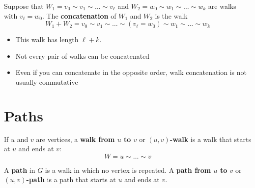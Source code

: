 \documentclass[ignorenonframetext,aspectratio=169]{beamer}
\let\defined\textbf
\begin{document}

\begin{frame}[label=concat-def]
\begin{definition}
Suppose that $W_1 = v_0 \sim v_1 \sim \dots \sim v_\ell$ and
$W_2 = w_0 \sim w_1 \sim \dots \sim w_k$
are walks with $v_\ell = w_0$.  The \defined{concatenation} of $W_1$ and $W_2$
is the walk
\[
   W_1 + W_2 = v_0 \sim v_1 \sim \dots \sim (v_\ell = w_0) \sim w_1 \sim \dots \sim w_k
\]
\end{definition}
\begin{itemize}
\item This walk has length $\ell+k$.
\item Not every pair of walks can be concatenated
\item Even if you can concatenate in the opposite order, walk concatenation is not usually commutative
\end{itemize}
\end{frame}

\section{Paths}

\begin{frame}[label=path-def]
\begin{definition}
    If $u$ and $v$ are vertices, a \defined{walk from $u$ to $v$} or \defined{$(u,v)$-walk} is a walk that starts at $u$ and ends at $v$:
    \[
        W = u \sim \dots \sim v
    \]
\end{definition}
\begin{definition}
    A \defined{path} in $G$ is a walk in which no vertex is repeated.
    A \defined{path from $u$ to $v$} or \defined{$(u,v)$-path} is a path that starts at $u$ and ends at $v$.
\end{definition}
\end{frame}
\end{document}
